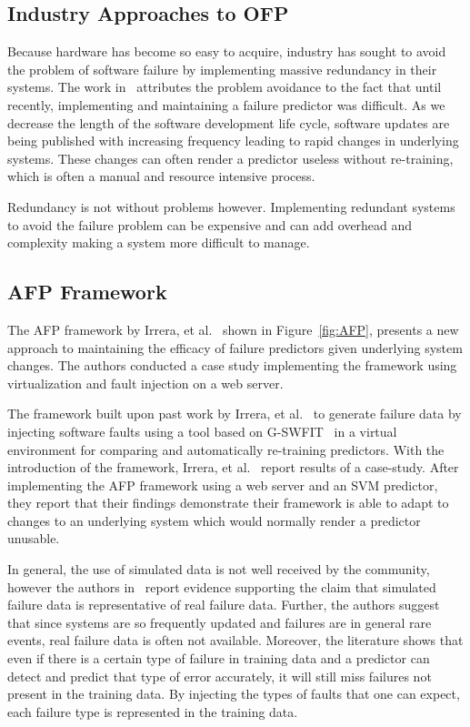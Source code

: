 \subsection{Industry Approaches to \ac{OFP}} \label{industry}
Because hardware has become so easy to acquire, industry has sought to avoid
the problem of software failure by implementing massive redundancy in their
systems.  The work in~\cite{irrera2015,watanabe2014} attributes the problem
avoidance to the fact that until recently, implementing and maintaining a
failure predictor was difficult.  As we decrease the length of the software
development life cycle, software updates are being published with increasing
frequency leading to rapid changes in underlying systems.  These changes can
often render a predictor useless without re-training, which is often a manual
and resource intensive process.

Redundancy is not without problems however.  Implementing redundant systems to
avoid the failure problem can be expensive and can add overhead and complexity
making a system more difficult to manage.

\subsection{\ac{AFP} Framework} \label{afp}
The \ac{AFP} framework by Irrera, et al.~\cite{irrera2015} shown in
Figure~\ref{fig:AFP}, presents a new approach to maintaining the efficacy of
failure predictors given underlying system changes.  The authors conducted a
case study implementing the framework using virtualization and fault injection
on a web server.  


The framework built upon past work by Irrera, et
al.~\cite{irrera2013,irrera2014} to generate failure data by injecting software
faults using a tool based on \ac{G-SWFIT}~\cite{gswfit} in a virtual
environment for comparing and automatically re-training predictors.  With the
introduction of the framework, Irrera, et al.~\cite{irrera2015} report results
of a case-study.  After implementing the \ac{AFP} framework using a web server
and an \ac{SVM} predictor, they report that their findings demonstrate their
framework is able to adapt to changes to an underlying system which would
normally render a predictor unusable.

In general, the use of simulated data is not well received by the community,
however the authors in~\cite{irrera2010,irrera2014} report evidence supporting
the claim that simulated failure data is representative of real failure data.
Further, the authors suggest that since systems are so frequently updated and
failures are in general rare events, real failure data is often not available.
Moreover, the literature shows that even if there is a certain type of failure
in training data and a predictor can detect and predict that type of error
accurately, it will still miss failures not present in the training data.  By
injecting the types of faults that one can expect, each failure type is
represented in the training data.

